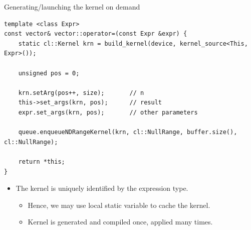 \documentclass[@BEAMER_OPTIONS@]{beamer}
\begin{document}
\begin{frame}[fragile]{Generating/launching the kernel on demand}
    \begin{exampleblock}{}
        \begin{lstlisting}
template <class Expr>
const vector& vector::operator=(const Expr &expr) {
    static cl::Kernel krn = build_kernel(device, kernel_source<This, Expr>());

    unsigned pos = 0;

    krn.setArg(pos++, size);       // n
    this->set_args(krn, pos);      // result
    expr.set_args(krn, pos);       // other parameters

    queue.enqueueNDRangeKernel(krn, cl::NullRange, buffer.size(), cl::NullRange);

    return *this;
}
        \end{lstlisting}
    \end{exampleblock}
    \begin{itemize}
        \item The kernel is uniquely identified by the expression type.
            \begin{itemize}
                \item Hence, we may use local static variable to cache the
                    kernel.
                \item Kernel is generated and compiled once, applied many
                    times.
            \end{itemize}
    \end{itemize}
\end{frame}

\note{ }
\end{document}
